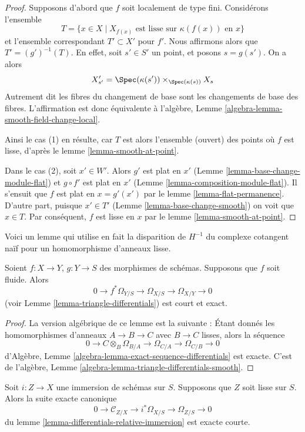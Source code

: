 \begin{proof}
Supposons d'abord que $f$ soit localement de type fini. Considérons l'ensemble
$$
T = \{x \in X \mid X_{f(x)}\text{ est lisse sur }\kappa(f(x))\text{ en }x\}
$$
et l'ensemble correspondant $T' \subset X'$ pour $f'$. Nous affirmons alors que
$T' = (g')^{-1}(T)$. En effet, soit $s' \in S'$ un point, et posons
$s = g(s')$. On a alors
$$
X'_{s'} =
\Spec(\kappa(s')) \times_{\Spec(\kappa(s))} X_s
$$
Autrement dit les fibres du changement de base sont les changements
de base des fibres. L'affirmation
est donc équivalente à l'algèbre, Lemme \ref{algebra-lemma-smooth-field-change-local}.

\medskip\noindent
Ainsi le cas (1) en résulte, car $T$ est alors l'ensemble (ouvert)
des points où $f$ est lisse, d'après le lemme \ref{lemma-smooth-at-point}.

\medskip\noindent
Dans le cas (2), soit $x' \in W'$. Alors $g'$
est plat en $x'$ (Lemme \ref{lemma-base-change-module-flat})
et $g \circ f'$ est plat en $x'$ (Lemme \ref{lemma-composition-module-flat}). Il s'ensuit
que $f$ est plat en $x = g'(x')$
par le lemme \ref{lemma-flat-permanence}. D'autre part, puisque $x' \in T'$
(Lemme \ref{lemma-base-change-smooth}) on voit que $x \in T$.
Par conséquent, $f$ est lisse en $x$
par le lemme \ref{lemma-smooth-at-point}.
\end{proof}

\noindent
Voici un lemme qui utilise en fait la disparition de $H^{-1}$ du complexe
cotangent naïf pour un homomorphisme d'anneaux lisse.

\begin{lemma}
\label{lemma-triangle-differentials-smooth}
Soient $f : X \to Y$, $g : Y \to S$ des morphismes de schémas. Supposons que
$f$ soit fluide. Alors
$$
0 \to f^*\Omega_{Y/S} \to \Omega_{X/S} \to \Omega_{X/Y} \to 0
$$
(voir Lemme \ref{lemma-triangle-differentials}) est court et exact.
\end{lemma}

\begin{proof}
La version algébrique de ce lemme est la suivante : Étant donnés
les homomorphismes d'anneaux $A \to B \to C$ avec $B \to C$ lisses, alors la séquence
$$
0 \to C \otimes_B \Omega_{B/A} \to \Omega_{C/A} \to \Omega_{C/B} \to 0
$$
d'Algèbre,
Lemme \ref{algebra-lemma-exact-sequence-differentials} est exacte.
C'est
de l'algèbre, Lemme \ref{algebra-lemma-triangle-differentials-smooth}.
\end{proof}

\begin{lemma}
\label{lemma-differentials-relative-immersion-smooth}
Soit $i : Z \to X$ une immersion de schémas sur $S$. Supposons
que $Z$ soit lisse sur $S$. Alors
la suite exacte canonique
$$
0 \to \mathcal{C}_{Z/X} \to i^*\Omega_{X/S} \to \Omega_{Z/S} \to 0
$$
du
lemme \ref{lemma-differentials-relative-immersion} est exacte
courte.
\end{lemma}

